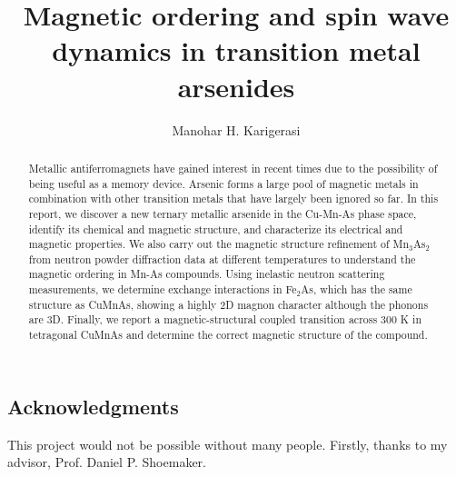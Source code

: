 \documentclass[10pt,doublespacing,edeposit]{uiucthesis2020}
\title{Magnetic ordering and spin wave dynamics in transition metal arsenides}
\author{Manohar H. Karigerasi}
\begin{document}
\maketitle


\begin{frontmatter}

\begin{abstract}
Metallic antiferromagnets have gained interest in recent times due to the possibility of being useful as a memory device. Arsenic forms a large pool of magnetic metals in combination with other transition metals that have largely been ignored so far. In this report, we discover a new ternary metallic arsenide in the Cu-Mn-As phase space, identify its chemical and magnetic structure, and characterize its electrical and magnetic properties. We also carry out the magnetic structure refinement of Mn$_3$As$_2$ from neutron powder diffraction data at different temperatures to understand the magnetic ordering in Mn-As compounds. Using inelastic neutron scattering measurements, we determine exchange interactions in Fe$_2$As, which has the same structure as CuMnAs, showing a highly 2D magnon character although the phonons are 3D. Finally, we report a magnetic-structural coupled transition across 300 K in tetragonal CuMnAs and determine the correct magnetic structure of the compound.
\end{abstract}

\chapter*{Acknowledgments}

This project would not be possible without many people. Firstly, thanks to my advisor, Prof. Daniel P. Shoemaker.


\tableofcontents
\listoftables
\listoffigures

\end{frontmatter}


\end{document}

